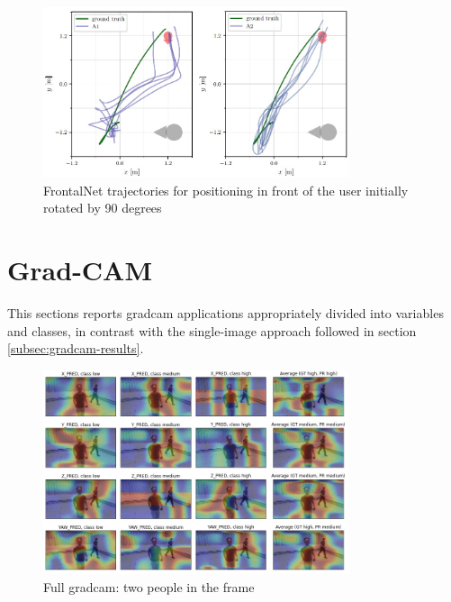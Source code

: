 \begin{figure}[!htb]
	\centering
	\includegraphics[width=0.8\textwidth]{"contents/images/03-frontalnet-trajectories"}
	\caption[FrontalNet trajectories for positioning in front of the user initially rotated by 90 degrees \cite{mantegazza2019visionbased}]{FrontalNet trajectories for positioning in front of the user initially rotated by 90 degrees \cite{mantegazza2019visionbased}}
	\label{fig:frontalnet-trajectories}
\end{figure}

\clearpage


\section{Grad-CAM}
\label{sec:extra-gradcam}

This sections reports \gls{gradcam} applications appropriately divided into variables and classes, in contrast with the single-image approach followed in section \ref{subsec:gradcam-results}.

\begin{figure}[!h]
	\centering
	\includegraphics[width=0.8\textwidth]{"contents/images/gradcam/apx-gradcam-1"}
	\caption[Full \gls{gradcam}: two people in the frame]{Full \gls{gradcam}: two people in the frame}
	\label{fig:apx-gradcam-1}
\end{figure}

